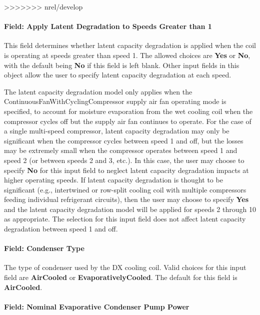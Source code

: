 >>>>>>> nrel/develop
\paragraph{Field: Apply Latent Degradation to Speeds Greater than 1}

This field determines whether latent capacity degradation is applied when the coil is operating at speeds greater than speed 1. The allowed choices are \textbf{Yes} or \textbf{No}, with the default being \textbf{No} if this field is left blank. Other input fields in this object allow the user to specify latent capacity degradation at each speed.

The latent capacity degradation model only applies when the ContinuousFanWithCyclingCompressor supply air fan operating mode is specified, to account for moisture evaporation from the wet cooling coil when the compressor cycles off but the supply air fan continues to operate. For the case of a single multi-speed compressor, latent capacity degradation may only be significant when the compressor cycles between speed 1 and off, but the losses may be extremely small when the compressor operates between speed 1 and speed 2 (or between speeds 2 and 3, etc.). In this case, the user may choose to specify \textbf{No} for this input field to neglect latent capacity degradation impacts at higher operating speeds. If latent capacity degradation is thought to be significant (e.g., intertwined or row-split cooling coil with multiple compressors feeding individual refrigerant circuits), then the user may choose to specify \textbf{Yes} and the latent capacity degradation model will be applied for speeds 2 through 10 as appropriate. The selection for this input field does not affect latent capacity degradation between speed 1 and off.

\paragraph{Field: Condenser Type}

The type of condenser used by the DX cooling coil. Valid choices for this input field are \textbf{AirCooled} or \textbf{EvaporativelyCooled}. The default for this field is \textbf{AirCooled}.

\paragraph{Field: Nominal Evaporative Condenser Pump Power}\label{field-nominal-evaporative-condenser-pump-power-1}

